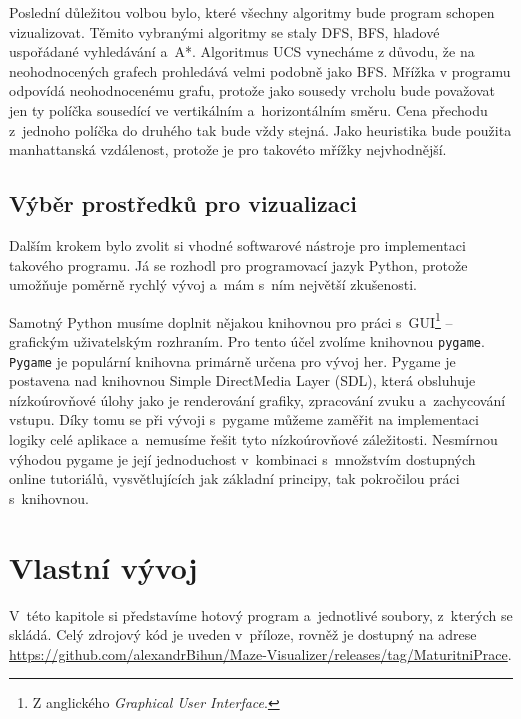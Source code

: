 \documentclass[12pt]{report}			%
\begin{document}
			Poslední důležitou volbou bylo, které všechny algoritmy bude program schopen vizualizovat. Těmito vybranými algoritmy se staly DFS, BFS, hladové uspořádané vyhledávání a~A*. Algoritmus UCS vynecháme z důvodu, že na neohodnocených grafech prohledává velmi podobně jako BFS. Mřížka v programu odpovídá neohodnocenému grafu, protože jako sousedy vrcholu bude považovat jen ty políčka sousedící ve vertikálním a~horizontálním směru. Cena přechodu z~jednoho políčka do druhého tak bude vždy stejná. Jako heuristika bude použita manhattanská vzdálenost, protože je pro takovéto mřížky nejvhodnější.
			
			\section{Výběr prostředků pro vizualizaci}
			Dalším krokem bylo zvolit si vhodné softwarové nástroje pro implementaci takového programu. Já se rozhodl pro programovací jazyk Python, protože umožňuje poměrně rychlý vývoj a~mám s~ním největší zkušenosti.
			
			Samotný Python musíme doplnit nějakou knihovnou pro práci s~GUI\footnote{Z anglického \emph{Graphical User Interface}.} -- grafickým uživatelským rozhraním. Pro tento účel zvolíme knihovnou \texttt{pygame}. \texttt{Pygame} je populární knihovna primárně určena pro vývoj her.  
			Pygame je postavena nad knihovnou Simple DirectMedia Layer (SDL), která obsluhuje nízkoúrovňové úlohy jako je renderování grafiky, zpracování zvuku a~zachycování vstupu. Díky tomu se při vývoji s~pygame můžeme zaměřit na implementaci logiky celé aplikace a~nemusíme řešit tyto nízkoúrovňové záležitosti.
			Nesmírnou výhodou pygame je její jednoduchost v~kombinaci s~množstvím dostupných online tutoriálů, vysvětlujících jak základní principy, tak pokročilou práci s~knihovnou.
			\cite{pygame_intro} \cite{pygame_about}
			
		
		\chapter{Vlastní vývoj}
		V~této kapitole si představíme hotový program a~jednotlivé soubory, z~kterých se skládá. Celý zdrojový kód je uveden v~příloze, rovněž je dostupný na adrese \url{https://github.com/alexandrBihun/Maze-Visualizer/releases/tag/MaturitniPrace}.
\end{document}
